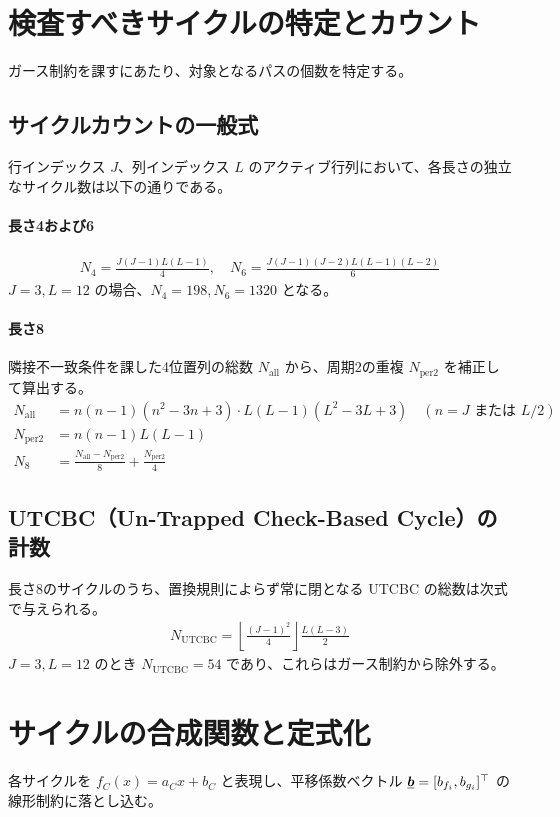 \documentclass[a4paper,11pt,dvipdfmx]{jsarticle}
\theoremstyle{definition}
\begin{document}
\section{検査すべきサイクルの特定とカウント}
ガース制約を課すにあたり、対象となるパスの個数を特定する。

\subsection{サイクルカウントの一般式}
行インデックス $J$、列インデックス $L$ のアクティブ行列において、各長さの独立なサイクル数は以下の通りである。

\paragraph{長さ4および6}
\begin{align}
  N_4 = \frac{J(J-1)L(L-1)}{4}, \quad N_6 = \frac{J(J-1)(J-2)L(L-1)(L-2)}{6}
\end{align}
$J=3, L=12$ の場合、$N_4=198, N_6=1320$ となる。

\paragraph{長さ8}
隣接不一致条件を課した4位置列の総数 $N_{\text{all}}$ から、周期2の重複 $N_{\text{per2}}$ を補正して算出する。
\begin{align}
  N_{\text{all}} &= n(n-1)(n^2-3n+3) \cdot L(L-1)(L^2-3L+3) \quad (n=J \text{ または } L/2) \\
  N_{\text{per2}} &= n(n-1)L(L-1) \\
  N_8 &= \frac{N_{\text{all}}-N_{\text{per2}}}{8} + \frac{N_{\text{per2}}}{4}
\end{align}

\subsection{UTCBC（Un-Trapped Check-Based Cycle）の計数}
長さ8のサイクルのうち、置換規則によらず常に閉となる UTCBC の総数は次式で与えられる。
\begin{align}
  N_{\text{UTCBC}} = \left\lfloor \frac{(J-1)^2}{4} \right\rfloor \frac{L(L-3)}{2}
\end{align}
$J=3, L=12$ のとき $N_{\text{UTCBC}}=54$ であり、これらはガース制約から除外する。

\section{サイクルの合成関数と定式化}
各サイクルを $f_C(x) = a_C x + b_C$ と表現し、平移係数ベクトル $\underline{\bm{b}} = [b_{f_i}, b_{g_i}]^\top$ の線形制約に落とし込む。
\end{document}
